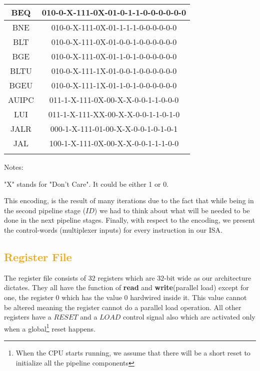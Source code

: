 \begin{center}
\begin{threeparttable}[!ht]
\begin{tabular}{|c|c|}
				BEQ &010-0-X-111-0X-01-0-1-1-0-0-0-0-0-0\\\hline
				BNE &010-0-X-111-0X-01-1-1-1-0-0-0-0-0-0\\\hline
				BLT &010-0-X-111-0X-01-0-0-1-0-0-0-0-0-0\\\hline
				BGE &010-0-X-111-0X-01-1-0-1-0-0-0-0-0-0\\\hline
				BLTU&010-0-X-111-1X-01-0-0-1-0-0-0-0-0-0\\\hline
				BGEU&010-0-X-111-1X-01-1-0-1-0-0-0-0-0-0\\\Xhline{5\arrayrulewidth}
				
				AUIPC&011-1-X-111-0X-00-X-X-0-0-1-1-0-0-0\\\hline
				LUI  &011-1-X-111-XX-00-X-X-0-0-1-1-0-1-0\\\hline
				JALR &000-1-X-111-01-00-X-X-0-0-1-0-1-0-1\\\hline
				JAL  &100-1-X-111-0X-00-X-X-0-0-1-1-1-0-0\\\Xhline{5\arrayrulewidth}
										
			\end{tabular}
				\begin{tablenotes}
				\footnotesize
				\item 
				Notes:
				\item 	
				"X" stands for "Don't Care". It could be either 1 or 0.
				\end{tablenotes}
				
				\label{Table3.2}
				\vspace{3mm}
		\end{threeparttable}
	
\end{center}

	This encoding, is the result of many iterations due to the fact that while being in the second pipeline stage ($ID$) we had to think about what will be needed to be done in the next pipeline stages. Finally, with respect to the encoding, we present the control-words (multiplexer inputs) for every instruction in our ISA.\\

\subsection{\textcolor{orange}{Register File}}
\label{SubSec3.2.3:REG FILE}
	The register file consists of $32$ registers which are $32$-bit wide as our architecture dictates. They all have the function of \textbf{read} and \textbf{write}(parallel load) except for one, the register $0$ which has the value $0$ hardwired inside it. This value cannot be altered meaning the register cannot do a parallel load operation. All other registers have a $RESET$ and a $LOAD$ control signal also which are activated only when a global\footnote{When the CPU starts running, we assume that there will be a short reset to initialize all the pipeline components} reset happens.\\
	

